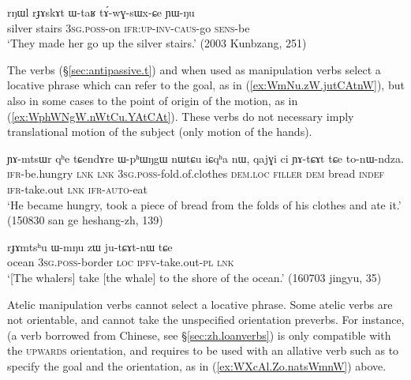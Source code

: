 \begin{exe}
\ex \label{ex:WtaR.tAwGsWxCe}
\gll rŋɯl rɟɤskɤt ɯ-taʁ tɤ́-wɣ-sɯx-ɕe ɲɯ-ŋu \\
silver stairs \textsc{3sg}.\textsc{poss}-on \textsc{ifr}:\textsc{up}-\textsc{inv}-\textsc{caus}-go \textsc{sens}-be \\
\glt `They made her go up the silver stairs.' (2003 Kunbzang, 251)
\end{exe}


The verbs  (§\ref{sec:antipassive.t}) and  when used as manipulation verbs select a locative phrase which can refer to the goal, as in (\ref{ex:WmNu.zW.jutCAtnW}), but also in some cases to the point of origin of the motion, as in (\ref{ex:WphWNgW.nWtCu.YAtCAt}). These verbs do not necessary imply translational motion of the subject (only motion of the hands).

\begin{exe}
\ex \label{ex:WphWNgW.nWtCu.YAtCAt}
\gll ɲɤ-mtsɯr qʰe tɕendɤre ɯ-pʰɯŋgɯ nɯtɕu iɕqʰa nɯ, qajɣi ci ɲɤ-tɕɤt tɕe to-nɯ-ndza. \\
\textsc{ifr}-be.hungry \textsc{lnk} \textsc{lnk} \textsc{3sg}.\textsc{poss}-fold.of.clothes \textsc{dem}.\textsc{loc} \textsc{filler} \textsc{dem} bread \textsc{indef} \textsc{ifr}-take.out \textsc{lnk} \textsc{ifr}-\textsc{auto}-eat \\
\glt `He became hungry, took a piece of bread from the folds of his clothes and ate it.' (150830 san ge heshang-zh, 139)
\end{exe}

\begin{exe}
\ex \label{ex:WmNu.zW.jutCAtnW}
\gll   rɟɤmtsʰu ɯ-mŋu zɯ ju-tɕɤt-nɯ tɕe \\
ocean \textsc{3sg}.\textsc{poss}-border \textsc{loc} \textsc{ipfv}-take.out-\textsc{pl} \textsc{lnk} \\
\glt `[The whalers] take [the whale] to the shore of the ocean.' (160703 jingyu, 35)
\end{exe}

Atelic manipulation verbs cannot select a locative phrase. Some atelic verbs are not orientable, and cannot take the unspecified orientation preverbs. For instance,  (a verb borrowed from Chinese, see §\ref{sec:zh.loanverbs}) is only compatible with the \textsc{upwards} orientation, and requires to be used with an allative verb such as  to specify the goal and the orientation, as in (\ref{ex:WXcAl.Zo.natsWmnW}) above.


